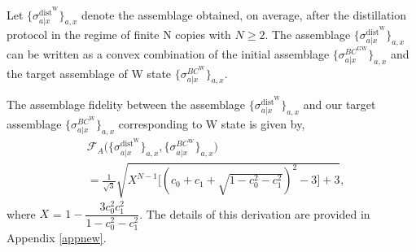 \documentclass[reprint,superscriptaddress,nofootinbib,amsmath,amssymb,aps,pra,longbibliography]{revtex4-1}
\begin{document}
 Let $\{\sigma_{a|x}^{\text{dist}^{\text{W}}}\}_{a,x}$ denote the assemblage obtained, on average, after the distillation protocol in the regime of finite N copies with $N \geq 2$. The assemblage $\{\sigma_{a|x}^{\text{dist}^{\text{W}}}\}_{a,x}$ can be written as a convex combination of the initial assemblage $\{\sigma_{a|x}^{BC^{\text{GW}}}\}_{a,x}$ and the target assemblage of W state $\{\sigma_{a|x}^{BC^{\text{W}}}\}_{a,x}$.

 
The assemblage fidelity between the assemblage $\{\sigma_{a|x}^{\text{dist}^{\text{W}}}\}_{a,x}$ and our target assemblage $\{\sigma_{a|x}^{BC^{\text{W}}}\}_{a,x}$ corresponding to W state  is given by,
\begin{align}
    &\mathcal{F}_{A} \Big( \{\sigma_{a|x}^{\text{dist}^{\text{W}}} \}_{a,x}, \{\sigma_{a|x}^{BC^{\text{W}}}\}_{a,x} \Big) \nonumber \\
    &= \frac{1}{\sqrt{3}} \sqrt{ X^{N-1}  \Big[ (c_0 + c_1 + \sqrt{1- c_0^2 - c_1^2})^2 -3 \Big] + 3},
     \label{assfidw1app}
\end{align}
where $X$ = $1-\dfrac{3 c_0^2 c_1^2}{ 1-c_0^2-c_1^2}$. The details of this derivation are provided in Appendix \ref{appnew}.
\end{document}
